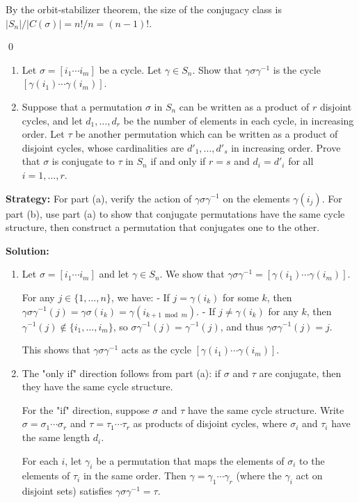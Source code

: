 By the orbit-stabilizer theorem, the size of the conjugacy class is $|S_n|/|C(\sigma)| = n!/n = (n-1)!$.


\qed
\begin{problembox}
\begin{enumerate}[label=(\alph*)]
\item Let $\sigma = [i_1 \cdots i_m]$ be a cycle. Let $\gamma \in S_n$. Show that $\gamma\sigma\gamma^{-1}$ is the cycle $[\gamma(i_1) \cdots \gamma(i_m)]$.
\item Suppose that a permutation $\sigma$ in $S_n$ can be written as a product of $r$ disjoint cycles, and let $d_1, \ldots, d_r$ be the number of elements in each cycle, in increasing order. Let $\tau$ be another permutation which can be written as a product of disjoint cycles, whose cardinalities are $d'_1, \ldots, d'_s$ in increasing order. Prove that $\sigma$ is conjugate to $\tau$ in $S_n$ if and only if $r = s$ and $d_i = d'_i$ for all $i = 1, \ldots, r$.
\end{enumerate}
\end{problembox}

\noindent\textbf{Strategy:} For part (a), verify the action of $\gamma\sigma\gamma^{-1}$ on the elements $\gamma(i_j)$. For part (b), use part (a) to show that conjugate permutations have the same cycle structure, then construct a permutation that conjugates one to the other.

\noindent\textbf{Solution:}
\begin{enumerate}[label=(\alph*)]
\item Let $\sigma = [i_1 \cdots i_m]$ and let $\gamma \in S_n$. We show that $\gamma\sigma\gamma^{-1} = [\gamma(i_1) \cdots \gamma(i_m)]$.

For any $j \in \{1, \ldots, n\}$, we have:
- If $j = \gamma(i_k)$ for some $k$, then $\gamma\sigma\gamma^{-1}(j) = \gamma\sigma(i_k) = \gamma(i_{k+1 \bmod m})$.
- If $j \neq \gamma(i_k)$ for any $k$, then $\gamma^{-1}(j) \notin \{i_1, \ldots, i_m\}$, so $\sigma\gamma^{-1}(j) = \gamma^{-1}(j)$, and thus $\gamma\sigma\gamma^{-1}(j) = j$.

This shows that $\gamma\sigma\gamma^{-1}$ acts as the cycle $[\gamma(i_1) \cdots \gamma(i_m)]$.

\item The "only if" direction follows from part (a): if $\sigma$ and $\tau$ are conjugate, then they have the same cycle structure.

For the "if" direction, suppose $\sigma$ and $\tau$ have the same cycle structure. Write $\sigma = \sigma_1 \cdots \sigma_r$ and $\tau = \tau_1 \cdots \tau_r$ as products of disjoint cycles, where $\sigma_i$ and $\tau_i$ have the same length $d_i$.

For each $i$, let $\gamma_i$ be a permutation that maps the elements of $\sigma_i$ to the elements of $\tau_i$ in the same order. Then $\gamma = \gamma_1 \cdots \gamma_r$ (where the $\gamma_i$ act on disjoint sets) satisfies $\gamma\sigma\gamma^{-1} = \tau$.
\end{enumerate}



